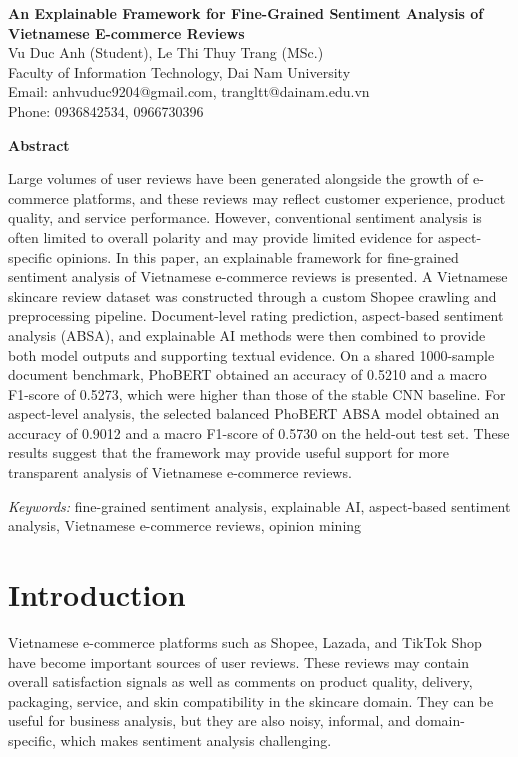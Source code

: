 \documentclass[a4paper,12pt]{extarticle}
\begin{document}
\begin{center}
\textbf{An Explainable Framework for Fine-Grained Sentiment Analysis of Vietnamese E-commerce Reviews}\\[0.5em]

Vu Duc Anh (Student), Le Thi Thuy Trang (MSc.)\\
Faculty of Information Technology, Dai Nam University\\
Email: anhvuduc9204@gmail.com, trangltt@dainam.edu.vn\\
Phone: 0936842534, 0966730396
\end{center}

\begin{center}
\textbf{Abstract}
\end{center}


Large volumes of user reviews have been generated alongside the growth of e-commerce platforms, and these reviews may reflect customer experience, product quality, and service performance. However, conventional sentiment analysis is often limited to overall polarity and may provide limited evidence for aspect-specific opinions. In this paper, an explainable framework for fine-grained sentiment analysis of Vietnamese e-commerce reviews is presented. A Vietnamese skincare review dataset was constructed through a custom Shopee crawling and preprocessing pipeline. Document-level rating prediction, aspect-based sentiment analysis (ABSA), and explainable AI methods were then combined to provide both model outputs and supporting textual evidence. On a shared 1000-sample document benchmark, PhoBERT obtained an accuracy of 0.5210 and a macro F1-score of 0.5273, which were higher than those of the stable CNN baseline. For aspect-level analysis, the selected balanced PhoBERT ABSA model obtained an accuracy of 0.9012 and a macro F1-score of 0.5730 on the held-out test set. These results suggest that the framework may provide useful support for more transparent analysis of Vietnamese e-commerce reviews.


\textit{Keywords:} fine-grained sentiment analysis, explainable AI, aspect-based sentiment analysis, Vietnamese e-commerce reviews, opinion mining
\vspace{1em}

\section{Introduction}

Vietnamese e-commerce platforms such as Shopee, Lazada, and TikTok Shop have become important sources of user reviews. These reviews may contain overall satisfaction signals as well as comments on product quality, delivery, packaging, service, and skin compatibility in the skincare domain. They can be useful for business analysis, but they are also noisy, informal, and domain-specific, which makes sentiment analysis challenging.
\end{document}

